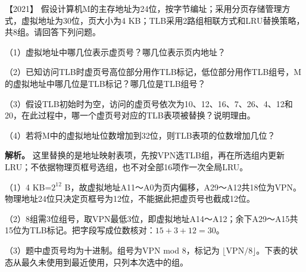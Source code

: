 \noindent{}【2021】 假设计算机M的主存地址为24位，按字节编址；采用分页存储管理方式，虚拟地址为30位，页大小为4 KB；TLB采用2路组相联方式和LRU替换策略，共8组。请回答下列问题。

（1）虚拟地址中哪几位表示虚页号？哪几位表示页内地址？

（2）已知访问TLB时虚页号高位部分用作TLB标记，低位部分用作TLB组号，M的虚拟地址中哪几位是TLB标记？哪几位是TLB组号？

（3）假设TLB初始时为空，访问的虚页号依次为10、12、16、7、26、4、12和20，在此过程中，哪一个虚页号对应的TLB表项被替换？说明理由。

（4）若将M中的虚拟地址位数增加到32位，则TLB表项的位数增加几位？


\textbf{解析。} 这里替换的是地址映射表项，先按VPN选TLB组，再在所选组内更新LRU；不依据物理页框号选组，也不对全部16项作一次全局LRU。

（1）4 KB=\(2^{12}\) B，故虚拟地址A11～A0为页内偏移，A29～A12共18位为VPN。物理地址24位只决定页框号为12位，不能据此把虚页号也截成12位。

（2）8组需3位组号，取VPN最低3位，即虚拟地址A14～A12；余下A29～A15共15位为TLB标记。把字段写成位数核对：\(15+3+12=30\)。

（3）题中虚页号均为十进制。组号为VPN mod 8，标记为 \(\lfloor\mathrm{VPN}/8\rfloor\)。下表的状态从最久未使用到最近使用，只列本次选中的组。

